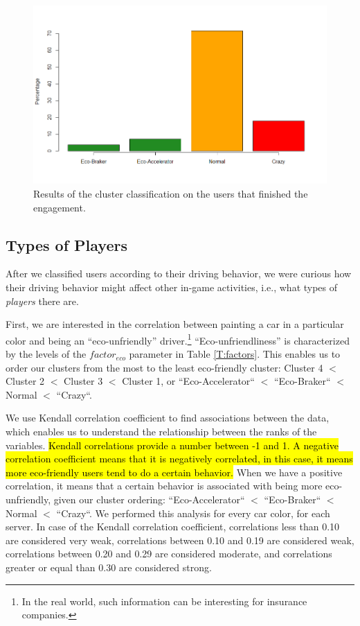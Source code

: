 \documentclass[preprint,authoryear,12pt]{elsarticle}
\begin{document}
\begin{figure}[tb]
	\begin{center}
		\includegraphics[width=1\linewidth]{ijhcs14-img/Rplot01}
		\caption{Results of the cluster classification on the users that finished the engagement. \label{fig:clusteringengagement}}
	\end{center}
\end{figure}

\subsection{Types of Players}

After we classified users according to their driving behavior, we were curious how their driving behavior might affect other in-game activities, i.e., what types of {\em players\/} there are.

First, we are interested in the correlation between painting a car in a particular color and being an ``eco-unfriendly'' driver.\footnote{In the real world, such information can be interesting for insurance companies.}
``Eco-unfriendliness'' is characterized by the levels of the $factor_{eco}$ parameter in Table \ref{T:factors}. This enables us to order our clusters from the most to the least eco-friendly cluster: Cluster 4 $<$ Cluster 2 $<$ Cluster 3 $<$ Cluster 1, or ``Eco-Accelerator``  $<$ ``Eco-Braker`` $<$  Normal $<$ ``Crazy``.

We use Kendall correlation coefficient to find associations between the data, which enables us to understand the relationship between the ranks of the variables. \hl{Kendall correlations provide a number between -1 and 1. A negative correlation coefficient means that it is negatively correlated, in this case, it means more eco-friendly users tend to do a certain behavior.} When we have a positive correlation, it means that a certain behavior is associated with being more eco-unfriendly, given our cluster ordering: ``Eco-Accelerator``  $<$ ``Eco-Braker`` $<$  Normal $<$ ``Crazy``.  We performed this analysis for every car color, for each server.
In case of the Kendall correlation coefficient, correlations less than 0.10 are considered very weak, correlations between 0.10 and 0.19 are considered weak, correlations between 0.20 and 0.29 are considered moderate, and correlations greater or equal than 0.30 are considered strong.
\end{document}
